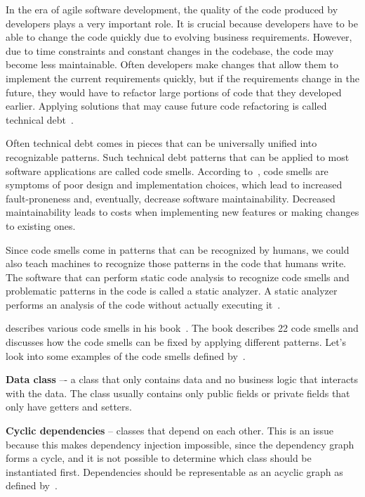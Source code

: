 
In the era of agile software development, the quality of the code produced by developers plays a very important role.
It is crucial because developers have to be able to change the code quickly due to evolving business requirements.
However, due to time constraints and constant changes in the codebase, the code may become less maintainable.
Often developers make changes that allow them to implement the current requirements quickly, but if the requirements
change in the future, they would have to refactor large portions of code that they developed earlier.
Applying solutions that may cause future code refactoring is called technical debt~\cite{technical-debt}.

Often technical debt comes in pieces that can be universally unified into recognizable patterns.
Such technical debt patterns that can be applied to most software applications are called code smells.
According to~\cite{code-smell-definition}, code smells are symptoms of poor design and implementation choices, which
lead to increased fault-proneness and, eventually, decrease software maintainability.
Decreased maintainability leads to costs when implementing new features or making changes to existing ones.

Since code smells come in patterns that can be recognized by humans, we could also teach machines to recognize those
patterns in the code that humans write.
The software that can perform static code analysis to recognize code smells and problematic patterns in the code
is called a static analyzer.
A static analyzer performs an analysis of the code without actually executing it~\cite{static-analyzers-paper}.

\citeauthor{refactoring-fowler} describes various code smells in his book~\cite{refactoring-fowler}.
The book describes 22 code smells and discusses how the code smells can be fixed by applying different
patterns.
Let's look into some examples of the code smells defined by~\citeauthor{refactoring-fowler}.

\begin{flushleft}
    \textbf{Data class} –- a class that only contains data and no business logic that interacts with the data.
    The class usually contains only public fields or private fields that only have getters and setters.
\end{flushleft}

\begin{flushleft}
    \textbf{Cyclic dependencies} -- classes that depend on each other.
    This is an issue because this makes dependency injection impossible, since the dependency graph forms a cycle, and it is not possible to determine which class should be instantiated first.
    Dependencies should be representable as an acyclic graph as defined by~\citeauthor{refactoring-fowler}.
\end{flushleft}

